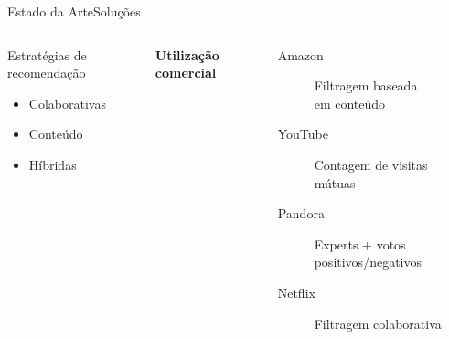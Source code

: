 \begin{frame}{Estado da Arte}{Soluções}
\begin{columns}[c]
\begin{block}{Estratégias de recomendação}
\begin{itemize}
	\item Colaborativas
	\item Conteúdo
	\item Híbridas
\end{itemize}
\end{block}





\textbf{Utilização comercial} \\ \cite{chiang2012networked}

\begin{description}
\item[Amazon] Filtragem baseada \\ em conteúdo
\item[YouTube] Contagem de visitas mútuas
\item[Pandora] Experts + votos positivos/negativos
\item[Netflix] Filtragem colaborativa
\end{description}
\end{columns}
\end{frame}



